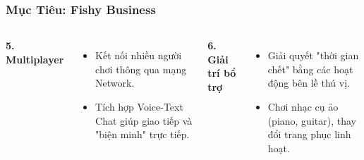 \begin{frame}
\frametitle{Mục Tiêu: Fishy Business}
\begin{columns}
    \textbf{5. Multiplayer}
    \begin{itemize}
        \item Kết nối nhiều người chơi thông qua mạng Network.
        \item Tích hợp Voice-Text Chat giúp giao tiếp và "biện minh" trực tiếp.
    \end{itemize}
    \vspace{0.8em} %

    \vspace{0.8em}
    \textbf{6. Giải trí bổ trợ}
    \begin{itemize}
        \item Giải quyết "thời gian chết" bằng các hoạt động bên lề thú vị.
        \item Chơi nhạc cụ ảo (piano, guitar), thay đổi trang phục linh hoạt.
    \end{itemize}
\end{columns}
\end{frame}

